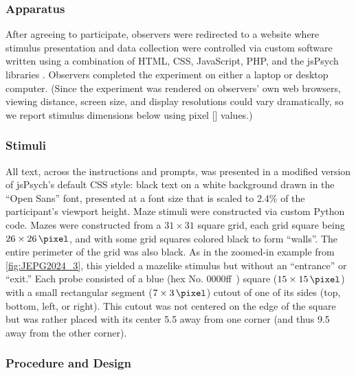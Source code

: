 \subsubsection{Apparatus}

After agreeing to participate, observers were redirected to a website where stimulus presentation and data collection were controlled via custom software written using a combination of HTML, CSS, JavaScript, PHP, and the jsPsych libraries \parencite{de_leeuw_jspsych_2023}. Observers completed the experiment on either a laptop or desktop computer. (Since the experiment was rendered on observers’ own web browsers, viewing distance, screen size, and display resolutions could vary dramatically, so we report stimulus dimensions below using pixel [\unit{\pixel}] values.)

\subsubsection{Stimuli}

All text, across the instructions and prompts, was presented in a modified version of jsPsych’s default CSS style: black text on a white background drawn in the “Open Sans” font, presented at a font size that is scaled to 2.4\% of the participant’s viewport height.
Maze stimuli were constructed via custom Python code. Mazes were constructed from a $31\times 31$ square grid, each grid square being $26\times\qty{26}{\pixel}$, and with some grid squares colored black to form “walls”. The entire perimeter of the grid was also black. As in the zoomed-in example from \cref{fig:JEPG2024_3}, this yielded a mazelike stimulus but without an “entrance” or “exit.”
Each probe consisted of a blue (hex No. 0000ff~) square ($15\times\qty{15}{\pixel}$) with a small rectangular segment ($7\times\qty{3}{\pixel}$) cutout of one of its sides (top, bottom, left, or right). This cutout was not centered on the edge of the square but was rather placed with its center \qty{5.5}{\pixel} away from one corner (and thus \qty{9.5}{\pixel} away from the other corner).

\subsubsection{Procedure and Design}

